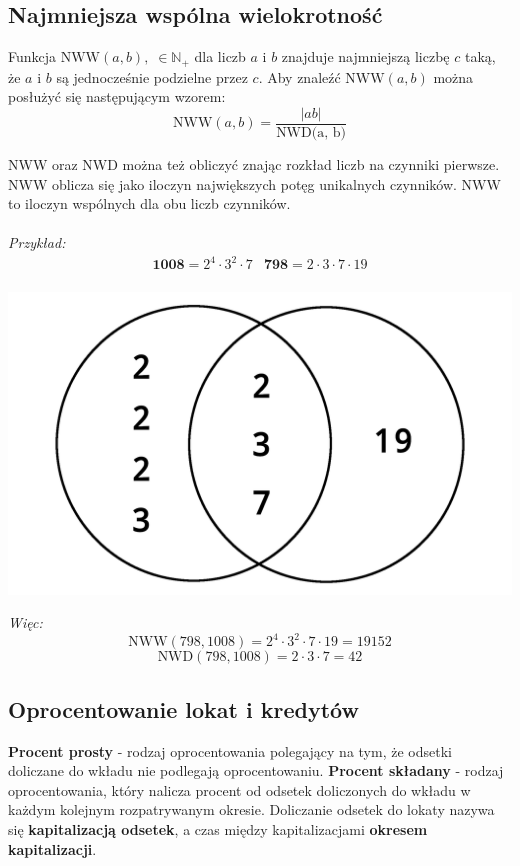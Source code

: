 \documentclass[14pt,a4paper]{extarticle}
\begin{document}
\noindent\subsection{Najmniejsza wspólna wielokrotność}
Funkcja $\text{NWW}(a, b),\;\in\mathbb{N}_{+}$ dla liczb $a$ i $b$ znajduje najmniejszą liczbę $c$ taką, że
$a$ i $b$ są jednocześnie podzielne przez $c$. Aby znaleźć $\text{NWW}(a, b)$ można posłużyć
się następującym wzorem:
$$\text{NWW}(a, b) = \frac{\vert ab \vert}{\text{NWD(a, b)}}$$

\noindent NWW oraz NWD można też obliczyć znając rozkład liczb na czynniki pierwsze. NWW oblicza się jako
iloczyn największych potęg unikalnych czynników. NWW to iloczyn wspólnych dla obu liczb
czynników.\\\\
\textit{Przykład:}
\begin{equation*}
\begin{array}{cc}
   \textbf{1008} = 2^{4} \cdot 3^{2} \cdot 7 & \textbf{798} = 2 \cdot 3 \cdot 7 \cdot 19\\
\end{array}
\end{equation*}

\includegraphics{viete-lcd.png}

\textit{Więc:}\\
$$\text{NWW}(798, 1008) = 2^{4} \cdot 3^{2} \cdot 7 \cdot 19 = 19152$$
$$\text{NWD}(798, 1008) = 2 \cdot 3 \cdot 7 = 42$$\hfill\break

\noindent\subsection{Oprocentowanie lokat i kredytów}

\noindent\textbf{Procent prosty}
 - rodzaj oprocentowania polegający na tym, że odsetki doliczane do wkładu nie podlegają oprocentowaniu.\hfill\break
\noindent\textbf{Procent składany}
 - rodzaj oprocentowania, który nalicza procent od odsetek doliczonych do wkładu w każdym kolejnym rozpatrywanym okresie.\hfill\break
 Doliczanie odsetek do lokaty nazywa się \textbf{kapitalizacją odsetek}, a czas między kapitalizacjami \textbf{okresem kapitalizacji}.\hfill\break\\
\end{document}
